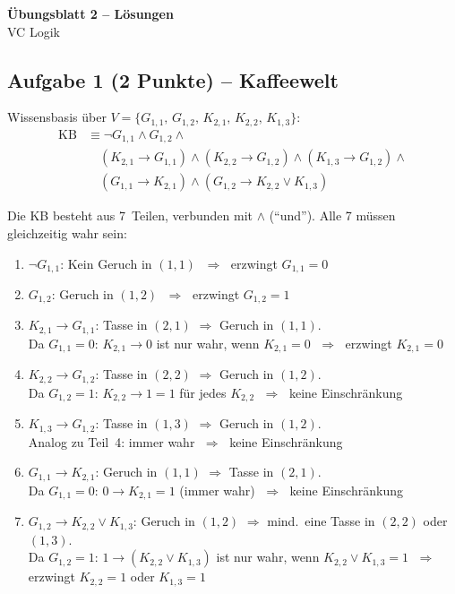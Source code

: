 \documentclass[a4paper,12pt]{article}
\begin{document}
\begin{center}
{\LARGE\bfseries \"Ubungsblatt 2 -- L\"osungen}\\[0.5em]
{\large VC Logik}
\end{center}

\bigskip

\subsection*{Aufgabe 1 \textnormal{(2 Punkte)} -- Kaffeewelt}

Wissensbasis \"uber $V = \{G_{1,1},\, G_{1,2},\, K_{2,1},\, K_{2,2},\, K_{1,3}\}$:
\begin{align*}
\text{KB} &\equiv \neg G_{1,1} \wedge G_{1,2} \wedge {} \\
&\quad (K_{2,1} \to G_{1,1}) \wedge (K_{2,2} \to G_{1,2}) \wedge (K_{1,3} \to G_{1,2}) \wedge {} \\
&\quad (G_{1,1} \to K_{2,1}) \wedge (G_{1,2} \to K_{2,2} \vee K_{1,3})
\end{align*}

Die KB besteht aus 7~Teilen, verbunden mit $\wedge$ ("`und"').
Alle 7 m\"ussen gleichzeitig wahr sein:

\begin{enumerate}
\item $\neg G_{1,1}$: Kein Geruch in $(1{,}1)$ $\;\Rightarrow\;$ erzwingt $G_{1,1} = 0$
\item $G_{1,2}$: Geruch in $(1{,}2)$ $\;\Rightarrow\;$ erzwingt $G_{1,2} = 1$
\item $K_{2,1} \to G_{1,1}$: Tasse in $(2{,}1)$ $\Rightarrow$ Geruch in $(1{,}1)$.\\
      Da $G_{1,1}=0$: $K_{2,1} \to 0$ ist nur wahr, wenn $K_{2,1}=0$
      $\;\Rightarrow\;$ erzwingt $K_{2,1} = 0$
\item $K_{2,2} \to G_{1,2}$: Tasse in $(2{,}2)$ $\Rightarrow$ Geruch in $(1{,}2)$.\\
      Da $G_{1,2}=1$: $K_{2,2} \to 1 = 1$ f\"ur jedes $K_{2,2}$
      $\;\Rightarrow\;$ keine Einschr\"ankung
\item $K_{1,3} \to G_{1,2}$: Tasse in $(1{,}3)$ $\Rightarrow$ Geruch in $(1{,}2)$.\\
      Analog zu Teil~4: immer wahr $\;\Rightarrow\;$ keine Einschr\"ankung
\item $G_{1,1} \to K_{2,1}$: Geruch in $(1{,}1)$ $\Rightarrow$ Tasse in $(2{,}1)$.\\
      Da $G_{1,1}=0$: $0 \to K_{2,1} = 1$ (immer wahr)
      $\;\Rightarrow\;$ keine Einschr\"ankung
\item $G_{1,2} \to K_{2,2} \vee K_{1,3}$: Geruch in $(1{,}2)$ $\Rightarrow$
      mind.\ eine Tasse in $(2{,}2)$ oder $(1{,}3)$.\\
      Da $G_{1,2}=1$: $1 \to (K_{2,2} \vee K_{1,3})$ ist nur wahr,
      wenn $K_{2,2} \vee K_{1,3} = 1$
      $\;\Rightarrow\;$ erzwingt $K_{2,2} = 1$ oder $K_{1,3} = 1$
\end{enumerate}
\end{document}

